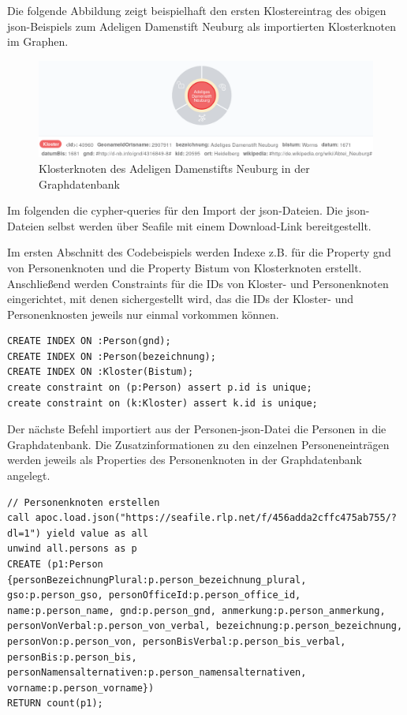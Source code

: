 \documentclass[ngerman,]{scrreprt}
\begin{document}
Die folgende Abbildung zeigt beispielhaft den ersten Klostereintrag des obigen json-Beispiels zum Adeligen Damenstift Neuburg als importierten Klosterknoten im Graphen.

\begin{figure}
\centering
\includegraphics{Bilder/Germania-Sacra-Klosterknoten.png}
\caption{Klosterknoten des Adeligen Damenstifts Neuburg in der Graphdatenbank}
\end{figure}

Im folgenden die cypher-queries für den Import der json-Dateien. Die json-Dateien selbst werden über Seafile mit einem Download-Link bereitgestellt.

Im ersten Abschnitt des Codebeispiels werden Indexe z.B. für die Property gnd von Personenknoten und die Property Bistum von Klosterknoten erstellt. Anschließend werden Constraints für die IDs von Kloster- und Personenknoten eingerichtet, mit denen sichergestellt wird, das die IDs der Kloster- und Personenknosten jeweils nur einmal vorkommen können.

\begin{verbatim}
CREATE INDEX ON :Person(gnd);
CREATE INDEX ON :Person(bezeichnung);
CREATE INDEX ON :Kloster(Bistum);
create constraint on (p:Person) assert p.id is unique;
create constraint on (k:Kloster) assert k.id is unique;
\end{verbatim}

Der nächste Befehl importiert aus der Personen-json-Datei die Personen in die Graphdatenbank. Die Zusatzinformationen zu den einzelnen Personeneinträgen werden jeweils als Properties des Personenknoten in der Graphdatenbank angelegt.

\begin{verbatim}
// Personenknoten erstellen
call apoc.load.json("https://seafile.rlp.net/f/456adda2cffc475ab755/?dl=1") yield value as all
unwind all.persons as p
CREATE (p1:Person {personBezeichnungPlural:p.person_bezeichnung_plural, gso:p.person_gso, personOfficeId:p.person_office_id, name:p.person_name, gnd:p.person_gnd, anmerkung:p.person_anmerkung, personVonVerbal:p.person_von_verbal, bezeichnung:p.person_bezeichnung, personVon:p.person_von, personBisVerbal:p.person_bis_verbal, personBis:p.person_bis, personNamensalternativen:p.person_namensalternativen, vorname:p.person_vorname})
RETURN count(p1);
\end{verbatim}
\end{document}
